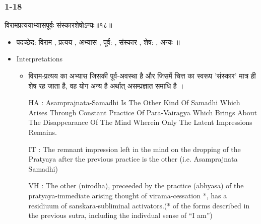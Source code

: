 \begin{frame}[fragile]\frametitle{1-18}
\begin{sanskrit}
विरामप्रत्ययाभ्यासपूर्वः संस्कारशेषोऽन्यः॥१८॥
\end{sanskrit}

	\begin{itemize}
	\item पदच्छेद: विराम , प्रत्यय , अभ्यास , पूर्व: , संस्कार , शेष: , अन्यः ॥
	\item Interpretations
		\begin{itemize}	
		\item विराम-प्रत्यय का अभ्यास जिसकी पूर्व-अवस्था है और जिसमें चित्त का स्वरूप 'संस्कार' मात्र ही शेष रह जाता है, वह योग अन्य है अर्थात् असम्प्रज्ञात समाधि है ।
		\item [HA]: Asamprajnata-Samadhi Is The Other Kind Of Samadhi Which Arises Through Constant Practice Of Para-Vairagya Which Brings About The Disappearance Of The Mind Wherein Only The Latent Impressions Remains.
		\item [IT]: The remnant impression left in the mind on the dropping of the Pratyaya after the previous practice is the other (i.e. Asamprajnata Samadhi)
		\item [VH]: The other (nirodha), preceeded by the practice (abhyasa) of the pratyaya-immediate arising thought of virama-cessation *, has a residiuum of sanskara-subliminal activators.(* of the forms described in the previous sutra, including the indivdual sense of “I am”)
		\end{itemize}
	\end{itemize}
	
\end{frame}

